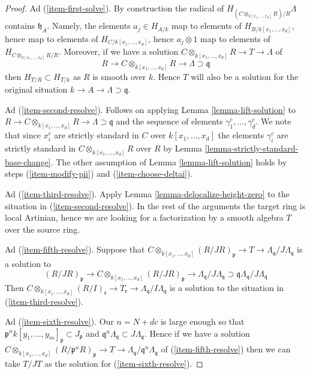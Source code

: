 \begin{proof}
\medskip\noindent
Ad (\ref{item-first-solve}). By construction the radical of
$H_{(C \otimes_{k[x_1, \ldots, x_d]} R)/R} \Lambda$ contains
$\mathfrak h_A$. Namely, the elements $a_j \in H_{A/k}$
map to elements of $H_{B/k[x_1, \ldots, x_d]}$, hence map to elements
of $H_{C/k[x_1, \ldots, x_d]}$, hence $a_j \otimes 1$ map to elements of
$H_{C \otimes_{k[x_1, \ldots, x_d]} R/R}$. Moreover, if we have a solution
$C \otimes_{k[x_1, \ldots, x_d]} R \to T \to \Lambda$ of
$$
R
\to
C \otimes_{k[x_1, \ldots, x_d]} R
\to
\Lambda \supset \mathfrak q
$$
then $H_{T/R} \subset H_{T/k}$ as $R$ is smooth over $k$.
Hence $T$ will also be a solution for
the original situation $k \to A \to \Lambda \supset \mathfrak q$.

\medskip\noindent
Ad (\ref{item-second-resolve}). Follows on applying
Lemma \ref{lemma-lift-solution} to
$R \to C \otimes_{k[x_1, \ldots, x_d]} R
\to \Lambda \supset \mathfrak q$ and the sequence of
elements $\gamma_1^c, \ldots, \gamma_d^c$. We note that since $x_i^c$
are strictly standard in $C$ over $k[x_1, \ldots, x_d]$ the elements
$\gamma_i^c$ are strictly standard in $C \otimes_{k[x_1, \ldots, x_d]} R$
over $R$ by Lemma \ref{lemma-strictly-standard-base-change}.
The other assumption of Lemma \ref{lemma-lift-solution} holds by steps
(\ref{item-modify-pii}) and (\ref{item-choose-deltai}).

\medskip\noindent
Ad (\ref{item-third-resolve}). Apply Lemma \ref{lemma-delocalize-height-zero}
to the situation in (\ref{item-second-resolve}). In the rest of the
arguments the target ring is local Artinian, hence we are looking for
a factorization by a smooth algebra $T$ over the source ring.

\medskip\noindent
Ad (\ref{item-fifth-resolve}).
Suppose that $C \otimes_{k[x_1, \ldots, x_d]} (R/JR)_\mathfrak p \to
T \to \Lambda_\mathfrak q/J\Lambda_\mathfrak q$ is a solution to
$$
(R/JR)_\mathfrak p \to
C \otimes_{k[x_1, \ldots, x_d]} (R/JR)_\mathfrak p \to
\Lambda_\mathfrak q/J\Lambda_\mathfrak q
\supset
\mathfrak q\Lambda_\mathfrak q/J\Lambda_\mathfrak q
$$
Then $C \otimes_{k[x_1, \ldots, x_d]} (R/I)_\mathfrak r \to T_\mathfrak r \to
\Lambda_\mathfrak q/I\Lambda_\mathfrak q$
is a solution to the situation in (\ref{item-third-resolve}).

\medskip\noindent
Ad (\ref{item-sixth-resolve}). Our $n = N + dc$ is large enough so that
$\mathfrak p^nk[y_1, \ldots, y_m]_\mathfrak p \subset J_\mathfrak p$
and $\mathfrak q^n \Lambda_\mathfrak q \subset J\Lambda_\mathfrak q$.
Hence if we have a solution
$C \otimes_{k[x_1, \ldots, x_d]} (R/\mathfrak p^nR)_\mathfrak p \to
T \to \Lambda_\mathfrak q/\mathfrak q^n\Lambda_\mathfrak q$
of (\ref{item-fifth-resolve})
then we can take $T/JT$ as the solution for
(\ref{item-sixth-resolve}).


\end{proof}
